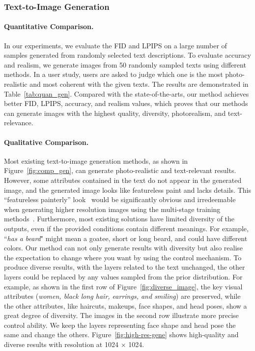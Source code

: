 \documentclass[final]{cvpr}
\begin{document}
\subsubsection{Text-to-Image Generation}
\label{subsec:exp_gen}

\paragraph{Quantitative Comparison.}
In our experiments, we evaluate the FID and LPIPS on a large number of samples generated from randomly selected text descriptions. 
To evaluate accuracy and realism, we generate images from 50 randomly sampled texts using different methods. In a user study, users are asked to judge which one is the most photo-realistic and most coherent with the given texts. 
The results are demonstrated in Table~\ref{tab:quan_gen}. 
Compared with the state-of-the-arts, our method achieves better FID, LPIPS, accuracy, and realism values, which proves that our methods can generate images with the highest quality, diversity, photorealism, and text-relevance. 

\vspace{-5pt}
\paragraph{Qualitative Comparison.} 
Most existing text-to-image generation methods, as shown in Figure~\ref{fig:comp_gen}, can generate photo-realistic and text-relevant results.
However, some attributes contained in the text do not appear in the generated image, and the generated image looks like featureless paint and lacks details.
This ``featureless painterly'' look~\cite{karras2019style} would be significantly obvious and irredeemable when generating higher resolution images using the multi-stage training methods~\cite{xu2018attngan,li2019control,zhu2019dmgan}.
Furthermore, most existing solutions have limited diversity of the outputs, even if the provided conditions contain different meanings. For example, ``\textit{has a beard}" might mean a goatee, short or long beard, and could have different colors.
Our method can not only generate results with diversity but also realise the expectation to change where you want by using the control mechanism.
To produce diverse results, with the layers related to the text unchanged, the other layers could be replaced by any values sampled from the prior distribution. 
For example, as shown in the first row of Figure~\ref{fig:diverse_image}, the key visual attributes (\textit{women, black long hair, earrings, and smiling}) are preserved, while the other attributes, like haircuts, makeups, face shapes, and head poses, show a great degree of diversity.
The images in the second row illustrate more precise control ability. We keep the layers representing face shape and head pose the same and change the others. 
Figure~\ref{fig:high-res-gene} shows high-quality and diverse results with resolution at 1024 $\times$ 1024. 
\end{document}
